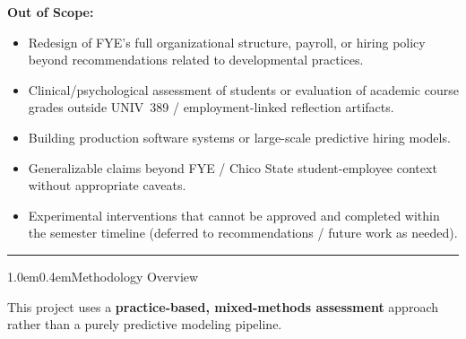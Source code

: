 \documentclass[11pt,letterpaper]{article}
\makeatletter
\newcommand{\sectionrule}{\par\vspace{0.4em}\noindent\rule{\textwidth}{0.6pt}\vspace{0.55em}}
\newcommand{\fieldlabel}[1]{\textbf{#1}}
\renewcommand\section{\@startsection{section}{1}{\z@}%
  {1.0em}{0.4em}{\large\bfseries}}
\makeatother
\begin{document}
\vspace{0.2em}
\fieldlabel{Out of Scope:}
\begin{itemize}
  \item Redesign of FYE's full organizational structure, payroll, or hiring policy beyond recommendations related to developmental practices.
  \item Clinical/psychological assessment of students or evaluation of academic course grades outside UNIV~389 / employment-linked reflection artifacts.
  \item Building production software systems or large-scale predictive hiring models.
  \item Generalizable claims beyond FYE / Chico State student-employee context without appropriate caveats.
  \item Experimental interventions that cannot be approved and completed within the semester timeline (deferred to recommendations / future work as needed).
\end{itemize}

\sectionrule

\section{Methodology Overview}

This project uses a \textbf{practice-based, mixed-methods assessment} approach rather than a purely predictive modeling pipeline.
\end{document}
